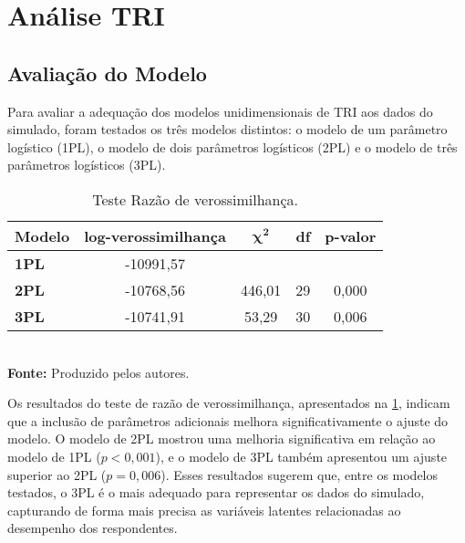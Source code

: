 \section{Análise TRI}

\subsection{Avaliação do Modelo}

Para avaliar a adequação dos modelos unidimensionais de TRI aos dados do simulado, foram
testados os três modelos distintos: o modelo de um parâmetro logístico (1PL), o modelo de dois parâmetros logísticos (2PL) e o modelo de três parâmetros logísticos (3PL).

\begin{table}[!htb]
	\centering
		\caption{Teste Razão de verossimilhança.}
		\label{tabela-anova}
		\begin{tabular}{lcccc}
			\hline
			\textbf{Modelo} &  \textbf{ log-verossimilhança }& $\boldsymbol{\chi^2}$ & \textbf{df} &\textbf{ p-valor }\\ 
			\hline
			\textbf{1PL} &  -10991,57 &  &  &  \\ 
			\hline
			\textbf{2PL} &  -10768,56 & 446,01 & 29 & 0,000 \\ 
			\hline
			\textbf{3PL} & -10741,91 & 53,29 & 30 & 0,006 \\ 
			\hline
		\end{tabular}\\
		\vspace*{0.5cm}
		\small{\textbf{Fonte:} Produzido pelos autores.}
\end{table}



Os resultados do teste de razão de verossimilhança, apresentados na \ref{tabela-anova}, indicam que a inclusão de parâmetros adicionais melhora significativamente o ajuste do modelo. O modelo de 2PL mostrou uma melhoria significativa em relação ao modelo de 1PL ($p < 0,001$), e o modelo de 3PL também apresentou um ajuste superior ao 2PL ($p = 0,006$). Esses resultados sugerem que, entre os modelos testados, o 3PL é o mais adequado para representar os dados do simulado, capturando de forma mais precisa as variáveis latentes relacionadas ao desempenho dos respondentes.

